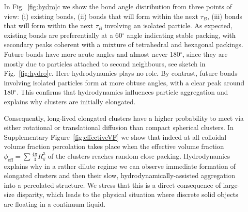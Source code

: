 \documentclass[preprint,footinbib,amsmath,amssymb,superscriptaddress]{revtex4}
\begin{document}
In Fig.~\ref{fig:hydro}c we show the bond angle distribution from three points of view: (i) existing bonds, (ii) bonds that will form within the next $\tau_B$, (iii) bonds that will form within the next $\tau_B$ involving an isolated particle. As expected, existing bonds are preferentially at a 60$^\circ$ angle indicating stable packing, with secondary peaks coherent with a mixture of tetrahedral and hexagonal packings. Future bonds have more acute angles and almost never 180$^\circ$, since they are mostly due to particles attached to second neighbours, see sketch in Fig.~\ref{fig:hydro}c. Here hydrodynamics plays no role. By contrast, future bonds involving isolated particles form at more obtuse angles, with a clear peak around 180$^\circ$. This confirms that hydrodynamics influences particle aggregation and explains why clusters are initially elongated.

Consequently, long-lived elongated clusters have a higher probability to meet via either rotational or translational diffusion than compact spherical clusters. In Supplementary Figure~\ref{fig:effectiveVF} we show that indeed at all colloidal volume fraction percolation takes place when the effective volume fraction $\phi_\text{eff} = \sum\frac{4\pi}{3}R_g^3$ of the clusters reaches random close packing. Hydrodynamics explains why in a rather dilute regime we can observe immediate formation of elongated clusters and then their slow, hydrodynamically-assisted aggregation into a percolated structure.
We stress that this is a direct consequence of large-size disparity, which leads to the physical situation where discrete solid objects are floating in a continuum liquid. 
\end{document}
